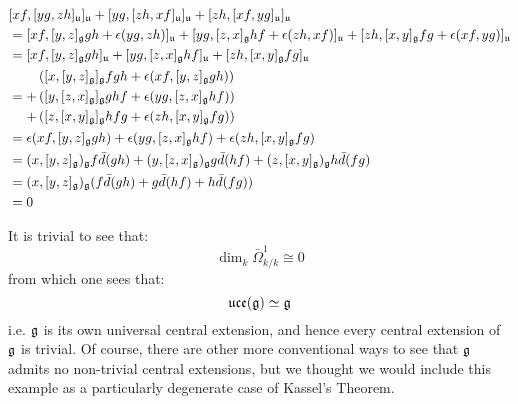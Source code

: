             $$
                \begin{aligned}
                    & [xf, [yg, zh]_{\mathfrak{u}}]_{\mathfrak{u}} + [yg, [zh, xf]_{\mathfrak{u}}]_{\mathfrak{u}} + [zh, [xf, yg]_{\mathfrak{u}}]_{\mathfrak{u}}
                    \\
                    & = [xf, [y, z]_{\mathfrak{g}} gh + \epsilon(yg, zh)]_{\mathfrak{u}} + [yg, [z, x]_{\mathfrak{g}} hf + \epsilon(zh, xf)]_{\mathfrak{u}} + [zh, [x, y]_{\mathfrak{g}} fg + \epsilon(xf, yg)]_{\mathfrak{u}}
                    \\
                    & = [xf, [y, z]_{\mathfrak{g}} gh]_{\mathfrak{u}} + [yg, [z, x]_{\mathfrak{g}} hf]_{\mathfrak{u}} + [zh, [x, y]_{\mathfrak{g}} fg]_{\mathfrak{u}}
                    \\
                    & = 
                    \begin{aligned}
                        & \left( [x, [y, z]_{\mathfrak{g}}]_{\mathfrak{g}} fgh + \epsilon(xf, [y, z]_{\mathfrak{g}} gh) \right)
                        \\
                        + & \left( [y, [z, x]_{\mathfrak{g}}]_{\mathfrak{g}} ghf + \epsilon(yg, [z, x]_{\mathfrak{g}} hf) \right)
                        \\
                        + & \left( [z, [x, y]_{\mathfrak{g}}]_{\mathfrak{g}} hfg + \epsilon(zh, [x, y]_{\mathfrak{g}} fg) \right)
                    \end{aligned}
                    \\
                    & = \epsilon(xf, [y, z]_{\mathfrak{g}} gh) + \epsilon(yg, [z, x]_{\mathfrak{g}} hf) + \epsilon(zh, [x, y]_{\mathfrak{g}} fg)
                    \\
                    & = (x, [y, z]_{\mathfrak{g}})_{\mathfrak{g}} f \bar{d}(gh) + (y, [z, x]_{\mathfrak{g}})_{\mathfrak{g}} g \bar{d}(hf) + (z, [x, y]_{\mathfrak{g}})_{\mathfrak{g}} h \bar{d}(fg)
                    \\
                    & = (x, [y, z]_{\mathfrak{g}})_{\mathfrak{g}} ( f \bar{d}(gh) + g \bar{d}(hf) + h \bar{d}(fg) )
                    \\
                    & = 0
                \end{aligned}
            $$
        \begin{example}
            It is trivial to see that:
                $$\dim_k \bar{\Omega}^1_{k/k} \cong 0$$
            from which one sees that:
                $$\mathfrak{uce}(\mathfrak{g}) \simeq \mathfrak{g}$$
            i.e. $\mathfrak{g}$ is its own universal central extension, and hence every central extension of $\mathfrak{g}$ is trivial. Of course, there are other more conventional ways to see that $\mathfrak{g}$ admits no non-trivial central extensions, but we thought we would include this example as a particularly degenerate case of Kassel's Theorem.
        \end{example}
